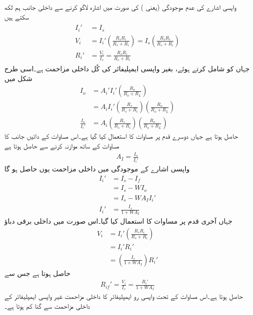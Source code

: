 واپسی اشارے کی  عدم موجودگی (یعنی ) کی صورت میں اشارہ   لاگو کرنے سے داخلی جانب  ہم لکھ سکتے ہیں
\begin{gather}
\begin{aligned}
I_i' &=I_s\\
V_i &= I_i' \left(\frac{R_s R_i}{R_s+R_i} \right ) =I_s \left(\frac{R_s R_i}{R_s+R_i} \right ) \\
R_i' &=\frac{V_i}{I_s}=\frac{R_s R_i}{R_s+R_i}
\end{aligned}
\end{gather}
جہاں  کو شامل کرتے ہوئے،  بغیر واپسی ایمپلیفائر کی کُل داخلی مزاحمت ہے۔اسی طرح شکل  میں 
\begin{align*}
I_o &= A_i'  I_i' \left( \frac{R_o}{R_o+R_L} \right )  \\
&=A_i  I_i' \left (\frac{R_s}{R_s+R_i} \right ) \left( \frac{R_o}{R_o+R_L} \right )  \\
 \frac{I_o}{I_i'} &=A_i \left (\frac{R_s}{R_s+R_i} \right ) \left( \frac{R_o}{R_o+R_L} \right )  
\end{align*}
حاصل ہوتا ہے جہاں دوسرے قدم پر مساوات  کا استعمال کیا گیا ہے۔اس مساوات کے دائیں جانب کا مساوات  کے ساتھ موازنہ کرنے سے حاصل ہوتا ہے
\begin{align} \label{مساوات_واپسی_رو_ایمپلیفائر_کی_افزائش_ب}
A_I=\frac{I_o}{I_i'}
\end{align}
واپسی اشارے کے موجودگی میں داخلی مزاحمت یوں حاصل ہو گا
\begin{align*}
I_i' &=I_s-I_f  \\
&=I_s -W I_o \\
&=I_s -W A_I I_i' \\
I_i' &=\frac{I_s}{1+W A_I}
\end{align*}
جہاں آخری قدم پر مساوات  کا استعمال کیا گیا۔اس صورت میں داخلی برقی دباؤ
\begin{align*}
V_i &= I_i' \left(\frac{R_s R_i}{R_s+R_i} \right ) \\
&=I_i' R_i' \\
& =\left(\frac{ I_s }{1+W A_I} \right) R_i' 
\end{align*}
حاصل ہوتا ہے جس سے 
\begin{align}\label{مساوات_واپسی_برقی_رو_کی_داخلی_مزاحمت}
R_{if}'=\frac{V_i}{I_s} =\frac{ R_i'}{1+W A_I}
\end{align}
حاصل ہوتا ہے۔اس مساوات کے تحت واپسی رو ایمپلیفائر  کا داخلی مزاحمت   غیر واپسی ایمپلیفائر کے داخلی مزاحمت  سے  گنا کم ہوتا ہے۔


